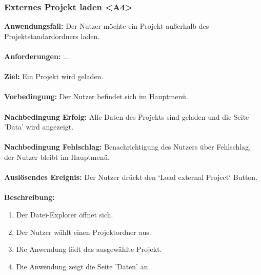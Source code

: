 \documentclass[parskip=full]{scrartcl} %
\begin{document}
\subsubsection*{Externes Projekt laden <A4>}
\textbf{Anwendungsfall:} Der Nutzer möchte ein Projekt außerhalb des Projektstandardordners laden.\\\\
\textbf{Anforderungen:} ...\\\\
\textbf{Ziel:} Ein Projekt wird geladen. \\\\
\textbf{Vorbedingung:} Der Nutzer befindet sich im Hauptmenü.  \\\\
\textbf{Nachbedingung Erfolg:} Alle Daten des Projekts sind geladen und die Seite 'Data' wird angezeigt. \\\\
\textbf{Nachbedingung Fehlschlag:} Benachrichtigung des Nutzers über Fehlschlag, der Nutzer bleibt im Hauptmenü. \\\\
\textbf{Auslösendes Ereignis:}  Der Nutzer drückt den `Load external Project` Button. \\\\
\textbf{Beschreibung:}
\begin{enumerate}
    \item Der Datei-Explorer öffnet sich.
    \item Der Nutzer wählt einen Projektordner aus.
    \item Die Anwendung lädt das ausgewählte Projekt.
    \item Die Anwendung zeigt die Seite 'Daten' an.
\end{enumerate}
\newpage
\end{document}
